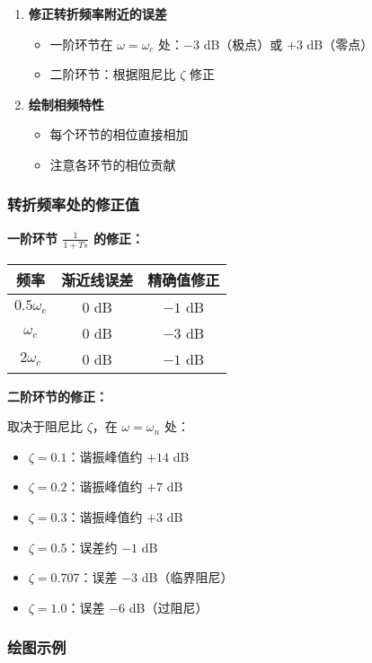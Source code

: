 \begin{enumerate}
    \item \textbf{修正转折频率附近的误差}
    \begin{itemize}
        \item 一阶环节在 $\omega = \omega_c$ 处：$-3$ dB（极点）或 $+3$ dB（零点）
        \item 二阶环节：根据阻尼比 $\zeta$ 修正
    \end{itemize}
    
    \item \textbf{绘制相频特性}
    \begin{itemize}
        \item 每个环节的相位直接相加
        \item 注意各环节的相位贡献
    \end{itemize}
\end{enumerate}

\subsubsection{转折频率处的修正值}

\textbf{一阶环节 $\frac{1}{1+Ts}$ 的修正：}

\begin{center}
\begin{tabular}{c|c|c}
\hline
频率 & 渐近线误差 & 精确值修正 \\
\hline
$0.5\omega_c$ & $0$ dB & $-1$ dB \\
$\omega_c$ & $0$ dB & $-3$ dB \\
$2\omega_c$ & $0$ dB & $-1$ dB \\
\hline
\end{tabular}
\end{center}

\textbf{二阶环节的修正：}

取决于阻尼比 $\zeta$，在 $\omega = \omega_n$ 处：
\begin{itemize}
    \item $\zeta = 0.1$：谐振峰值约 $+14$ dB
    \item $\zeta = 0.2$：谐振峰值约 $+7$ dB
    \item $\zeta = 0.3$：谐振峰值约 $+3$ dB
    \item $\zeta = 0.5$：误差约 $-1$ dB
    \item $\zeta = 0.707$：误差 $-3$ dB（临界阻尼）
    \item $\zeta = 1.0$：误差 $-6$ dB（过阻尼）
\end{itemize}

\subsubsection{绘图示例}

